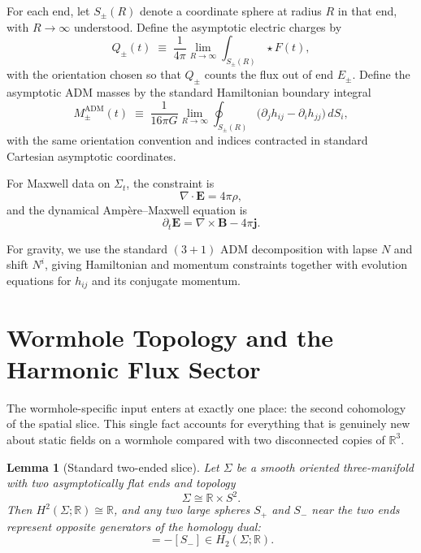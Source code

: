 \documentclass[aps,prd,onecolumn,nofootinbib,superscriptaddress]{revtex4-2}
\newtheorem{lemma}{Lemma}
\begin{document}
For each end, let $S_\pm(R)$ denote a coordinate sphere at radius $R$ in that end, with $R \to \infty$ understood. Define the asymptotic electric charges by
\begin{equation}
\label{eq:Qpm-def}
Q_\pm(t) \;\equiv\; \frac{1}{4\pi}\lim_{R\to\infty}\int_{S_\pm(R)} \star F(t),
\end{equation}
with the orientation chosen so that $Q_\pm$ counts the flux out of end $E_\pm$. Define the asymptotic ADM masses by the standard Hamiltonian boundary integral
\begin{equation}
\label{eq:Mpm-def}
M_\pm^{\mathrm{ADM}}(t) \;\equiv\; \frac{1}{16\pi G}\lim_{R\to\infty}\oint_{S_\pm(R)} \big(\partial_j h_{ij} - \partial_i h_{jj}\big)\,dS_i,
\end{equation}
with the same orientation convention and indices contracted in standard Cartesian asymptotic coordinates.\cite{ArnowittDeserMisner1962Dynamics,ReggeTeitelboim1974SurfaceIntegrals}

For Maxwell data on $\Sigma_t$, the constraint is
\begin{equation}
\nabla \cdot \bm{E} = 4\pi \rho,
\end{equation}
and the dynamical Amp\`ere--Maxwell equation is
\begin{equation}
\label{eq:ampere}
\partial_t \bm{E} = \nabla \times \bm{B} - 4\pi \bm{j}.
\end{equation}

For gravity, we use the standard $(3+1)$ ADM decomposition with lapse $N$ and shift $N^i$, giving Hamiltonian and momentum constraints together with evolution equations for $h_{ij}$ and its conjugate momentum.\cite{ArnowittDeserMisner1962Dynamics,Wald1984GeneralRelativity}

\section{Wormhole Topology and the Harmonic Flux Sector}
\label{sec:topology}

The wormhole-specific input enters at exactly one place: the second cohomology of the spatial slice. This single fact accounts for everything that is genuinely new about static fields on a wormhole compared with two disconnected copies of $\mathbb{R}^3$.

\begin{lemma}[Standard two-ended slice]
\label{lem:standard-topology}
Let $\Sigma$ be a smooth oriented three-manifold with two asymptotically flat ends and topology
\begin{equation}
\Sigma \cong \mathbb{R}\times S^2.
\end{equation}
Then $H^2(\Sigma;\mathbb{R}) \cong \mathbb{R}$, and any two large spheres $S_+$ and $S_-$ near the two ends represent opposite generators of the homology dual:
\begin{equation}
[S_+] = -[S_-] \in H_2(\Sigma;\mathbb{R}).
\end{equation}
\end{lemma}
\end{document}
